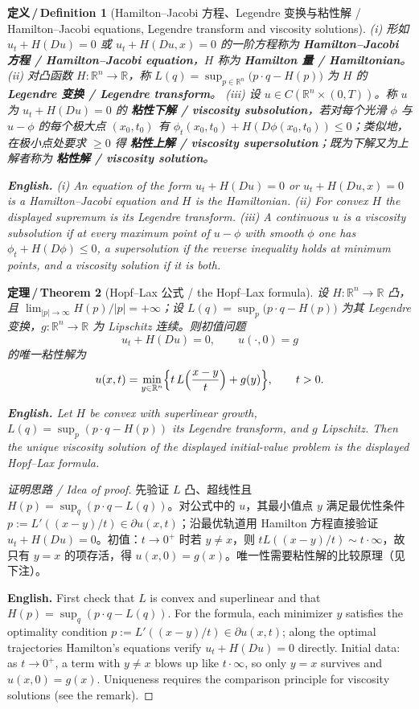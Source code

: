 \documentclass[UTF8,11pt,a4paper]{ctexart}
\newcommand{\EN}[1]{\par\noindent \textbf{English.} #1\par}
\newtheorem{definition}{定义\,/\,Definition}[section]
\newtheorem{theorem}[definition]{定理\,/\,Theorem}
\newcommand{\R}{\mathbb{R}}
\begin{document}
\begin{definition}[Hamilton--Jacobi 方程、Legendre 变换与粘性解 / Hamilton--Jacobi equations, Legendre transform and viscosity solutions]\label{def:hj}
(i) 形如 $u_t+H(Du)=0$ 或 $u_t+H(Du,x)=0$ 的一阶方程称为 \textbf{Hamilton--Jacobi 方程 / Hamilton--Jacobi equation}，$H$ 称为 \textbf{Hamilton 量 / Hamiltonian}。
(ii) 对凸函数 $H:\R^n\to\R$，称 $L(q)=\sup_{p\in\R^n}\bigl(p\cdot q-H(p)\bigr)$ 为 $H$ 的 \textbf{Legendre 变换 / Legendre transform}。
(iii) 设 $u\in C(\R^n\times(0,T))$。称 $u$ 为 $u_t+H(Du)=0$ 的 \textbf{粘性下解 / viscosity subsolution}，若对每个光滑 $\phi$ 与 $u-\phi$ 的每个极大点 $(x_0,t_0)$ 有 $\phi_t(x_0,t_0)+H(D\phi(x_0,t_0))\le0$；类似地，在极小点处要求 $\ge0$ 得 \textbf{粘性上解 / viscosity supersolution}；既为下解又为上解者称为 \textbf{粘性解 / viscosity solution}。
\EN{(i) An equation of the form $u_t+H(Du)=0$ or $u_t+H(Du,x)=0$ is a Hamilton--Jacobi equation and $H$ is the Hamiltonian. (ii) For convex $H$ the displayed supremum is its Legendre transform. (iii) A continuous $u$ is a viscosity subsolution if at every maximum point of $u-\phi$ with smooth $\phi$ one has $\phi_t+H(D\phi)\le0$, a supersolution if the reverse inequality holds at minimum points, and a viscosity solution if it is both.}
\end{definition}

\begin{theorem}[Hopf--Lax 公式 / the Hopf--Lax formula]\label{thm:hopflax}
设 $H:\R^n\to\R$ 凸，且 $\lim_{|p|\to\infty}H(p)/|p|=+\infty$；设 $L(q)=\sup_{p}\bigl(p\cdot q-H(p)\bigr)$ 为其 Legendre 变换，$g:\R^n\to\R$ 为 Lipschitz 连续。则初值问题
\[
u_t+H(Du)=0,\qquad u(\cdot,0)=g
\]
的唯一粘性解为
\[
u(x,t)=\min_{y\in\R^n}\Bigl\{t\,L\Bigl(\frac{x-y}{t}\Bigr)+g(y)\Bigr\},\qquad t>0 .
\]
\EN{Let $H$ be convex with superlinear growth, $L(q)=\sup_p(p\cdot q-H(p))$ its Legendre transform, and $g$ Lipschitz. Then the unique viscosity solution of the displayed initial-value problem is the displayed Hopf--Lax formula.}
\end{theorem}

\begin{proof}[证明思路 / Idea of proof]
先验证 $L$ 凸、超线性且 $H(p)=\sup_q(p\cdot q-L(q))$。对公式中的 $u$，其最小值点 $y$ 满足最优性条件 $p:=L'((x-y)/t)\in\partial u(x,t)$；沿最优轨道用 Hamilton 方程直接验证 $u_t+H(Du)=0$。初值：$t\to0^+$ 时若 $y\ne x$，则 $tL((x-y)/t)\sim t\cdot\infty$，故只有 $y=x$ 的项存活，得 $u(x,0)=g(x)$。唯一性需要粘性解的比较原理（见下注）。\EN{First check that $L$ is convex and superlinear and that $H(p)=\sup_q(p\cdot q-L(q))$. For the formula, each minimizer $y$ satisfies the optimality condition $p:=L'((x-y)/t)\in\partial u(x,t)$; along the optimal trajectories Hamilton's equations verify $u_t+H(Du)=0$ directly. Initial data: as $t\to0^+$, a term with $y\ne x$ blows up like $t\cdot\infty$, so only $y=x$ survives and $u(x,0)=g(x)$. Uniqueness requires the comparison principle for viscosity solutions (see the remark).}
\end{proof}
\end{document}
